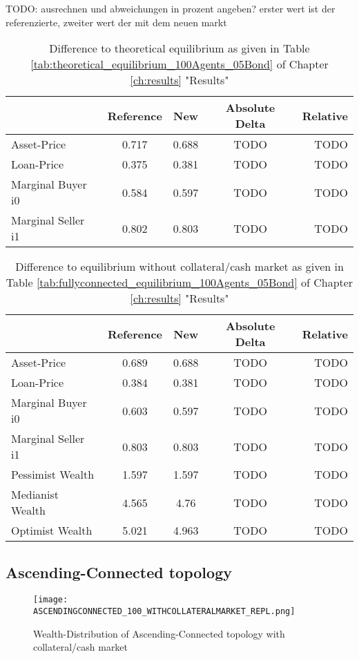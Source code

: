 \documentclass[Bachelorarbeit.tex]{subfiles}
\begin{document}
TODO: ausrechnen und abweichungen in prozent angeben?
erster wert ist der referenzierte, zweiter wert der mit dem neuen markt

\begin{table}[h]
	\caption{Difference to theoretical equilibrium as given in Table \ref{tab:theoretical_equilibrium_100Agents_05Bond} of Chapter \ref{ch:results} "Results"}
	\centering
	\begin{tabular} { l c c c r }
		& Reference & New & Absolute Delta & Relative \\
		\hline
		Asset-Price & 0.717 & 0.688 & TODO & TODO \\
		Loan-Price & 0.375 & 0.381 & TODO & TODO \\
		Marginal Buyer i0 & 0.584 & 0.597 & TODO & TODO \\
		Marginal Seller i1 & 0.802 & 0.803 & TODO & TODO \\
		\hline
	\end{tabular}
\end{table} 

\begin{table}[h]
	\caption{Difference to equilibrium without collateral/cash market as given in Table \ref{tab:fullyconnected_equilibrium_100Agents_05Bond} of Chapter \ref{ch:results} "Results"}
	\centering
	\begin{tabular} { l c c c r }
		& Reference & New & Absolute Delta & Relative \\
		\hline
		Asset-Price & 0.689 & 0.688 & TODO & TODO \\
		Loan-Price & 0.384 & 0.381 & TODO & TODO \\
		Marginal Buyer i0 & 0.603 & 0.597 & TODO & TODO \\
		Marginal Seller i1 & 0.803 & 0.803 & TODO & TODO \\
		\hline
		Pessimist Wealth & 1.597 & 1.597 & TODO & TODO \\
		Medianist Wealth & 4.565 & 4.76 & TODO & TODO \\
		Optimist Wealth & 5.021 & 4.963 & TODO & TODO \\
		\hline
	\end{tabular}
\end{table} 


\subsection{Ascending-Connected topology}
\begin{figure}[H]
	\centering
  \texttt{[image: ASCENDINGCONNECTED\_100\_WITHCOLLATERALMARKET\_REPL.png]}
	\caption{Wealth-Distribution of Ascending-Connected topology with collateral/cash market}
	\label{fig:wealth_ASCENDINGCONNECTED_100_WITHCOLLATERALMARKET_REPL}
\end{figure}
\end{document}

